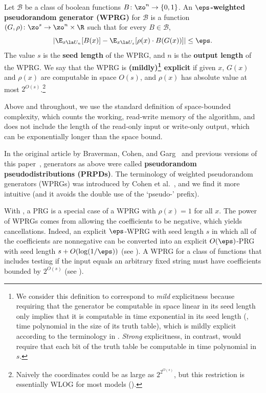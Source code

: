 \documentclass{toc}
\begin{document}
\begin{definition}\label{def:booleanWPRG}
	Let $\mathcal{B}$ be a class of boolean functions $B \colon \zo^n \to \{0, 1\}$. An \textbf{$\eps$-weighted pseudorandom generator (WPRG)} for $\mathcal{B}$ is a function $(G,\rho) \colon \zo^s \to \zo^n\times \R$ such that for every $B \in \mathcal{B}$,
	$$
		\left |\E_{x \la U_n}[B(x)] - \E_{x \la U_{s}}[\rho(x)\cdot B(G(x))]\right | \leq \eps.
	$$
	The value $s$ is the \textbf{seed length} of the WPRG, and $n$ is the \textbf{output length} of the WPRG. 
	We say that the WPRG is \textbf{(mildly)\footnote{We consider this definition to correspond to \emph{mild} explicitness because requiring that
	the generator be computable in space linear in its seed length only implies that it is computable in time exponential in its seed length (\ie, time polynomial in the size of its truth table), which is
	mildly explicit according to the terminology in \cite{vadhan2012pseudorandomness}.  \emph{Strong} explicitness, in contrast,
	would require that each bit of the truth table %
be %
computable in 
	time polynomial in $s$.} explicit} if given $x$, $G(x)$ and $\rho(x)$ are computable in space $O(s)$, and $\rho(x)$ 
	has absolute value at most $2^{O(s)}$.\footnote{Naively the coordinates could be as large as $2^{2^{O(s)}}$, but this restriction is essentially WLOG for most models ().}  %
\end{definition}
Above and throughout, we use the standard definition of space-bounded complexity, which counts the working, read-write memory of the algorithm, and does not include the length of the read-only input or write-only output, which can be exponentially longer than the space bound.

In the original %
article by %
Braverman, Cohen, and Garg~\cite{BravermanCoGa18} and previous versions of this paper~\cite{PyneVa20}, generators as above were called \textbf{pseudorandom pseudodistributions (PRPDs)}.  The terminology of weighted pseudorandom generators (WPRGs) was introduced
by Cohen et al.~\cite{CohenDoReSbTa21}, and we find it more intuitive
(and it avoids the double use of the `pseudo-' prefix).

With , a PRG is a special case of a WPRG with $\rho(x)=1$ for all $x$.  The power of WPRGs comes from allowing the coefficients
to be negative, which yields cancellations.  Indeed, an explicit $\eps$-WPRG with seed length $s$ in which all of the coefficients are nonnegative can be converted into an explicit $O(\eps)$-PRG with seed length $s+O(\log(1/\eps))$ (see ). A WPRG for a class of functions that includes testing if the input equals an arbitrary fixed string must have coefficients bounded by $2^{O(s)}$ (see ).
\end{document}
